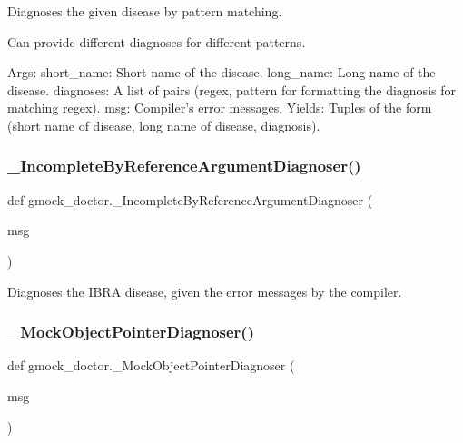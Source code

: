\begin{DoxyVerb}Diagnoses the given disease by pattern matching.

Can provide different diagnoses for different patterns.

Args:
  short_name: Short name of the disease.
  long_name:  Long name of the disease.
  diagnoses:  A list of pairs (regex, pattern for formatting the diagnosis
              for matching regex).
  msg:        Compiler's error messages.
Yields:
  Tuples of the form
    (short name of disease, long name of disease, diagnosis).
\end{DoxyVerb}
 \mbox{\label{namespacegmock__doctor_a57b4c1486c344bd12e4138c588029c19}} 
\subsubsection{\texorpdfstring{\_IncompleteByReferenceArgumentDiagnoser()}{\_IncompleteByReferenceArgumentDiagnoser()}}
{\footnotesize\ttfamily def gmock\+\_\+doctor.\+\_\+\+Incomplete\+By\+Reference\+Argument\+Diagnoser (\begin{DoxyParamCaption}\item[{}]{msg }\end{DoxyParamCaption})\hspace{0.3cm}{\ttfamily [private]}}

\begin{DoxyVerb}Diagnoses the IBRA disease, given the error messages by the compiler.\end{DoxyVerb}
 \mbox{\label{namespacegmock__doctor_a91e21533e0bc183c40f5a9873158a94b}} 
\subsubsection{\texorpdfstring{\_MockObjectPointerDiagnoser()}{\_MockObjectPointerDiagnoser()}}
{\footnotesize\ttfamily def gmock\+\_\+doctor.\+\_\+\+Mock\+Object\+Pointer\+Diagnoser (\begin{DoxyParamCaption}\item[{}]{msg }\end{DoxyParamCaption})\hspace{0.3cm}{\ttfamily [private]}}

